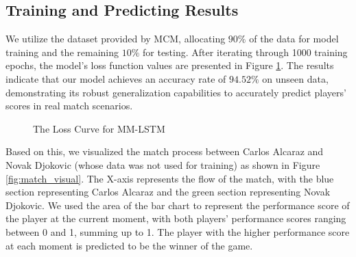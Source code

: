 \subsection{Training and Predicting Results}
We utilize the dataset provided by MCM, allocating \(90\%\) of the data for model training and the remaining \(10\%\) for testing. After iterating through 1000 training epochs, the model's loss function values are presented in Figure \ref{fig:lstm_loss}. The results indicate that our model achieves an accuracy rate of \(94.52\%\) on unseen data, demonstrating its robust generalization capabilities to accurately predict players' scores in real match scenarios.

\begin{figure}[htbp]
  \centering
  \caption{The Loss Curve for MM-LSTM}
  \label{fig:lstm_loss}
\end{figure}

Based on this, we visualized the match process between Carlos Alcaraz and Novak Djokovic (whose data was not used for training) as shown in Figure \ref{fig:match_visual}. The X-axis represents the flow of the match, with the blue section representing Carlos Alcaraz and the green section representing Novak Djokovic. We used the area of the bar chart to represent the performance score of the player at the current moment, with both players’ performance scores ranging between 0 and 1, summing up to 1. The player with the higher performance score at each moment is predicted to be the winner of the game.

